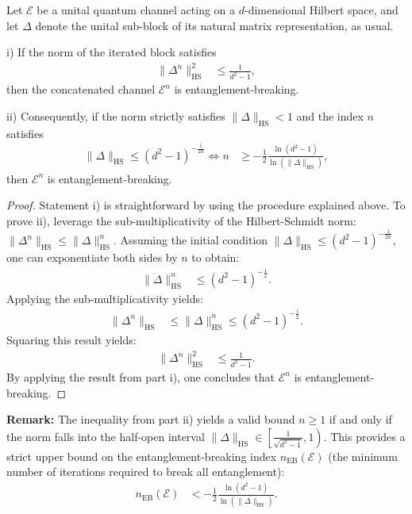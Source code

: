 


\begin{prop}
Let $\mathcal{E}$ be a unital quantum channel acting on a $d$-dimensional Hilbert space, and let $\Delta$ denote the unital sub-block of its natural matrix representation, as usual.

i) If the norm of the iterated block satisfies
\begin{align*}
    \|\Delta^n\|_{\text{HS}}^2 &\le \frac{1}{d^2 - 1},
\end{align*}
then the concatenated channel $\mathcal{E}^n$ is entanglement-breaking.

ii) Consequently, if the norm strictly satisfies $\|\Delta\|_{\text{HS}} < 1$ and the index $n$ satisfies
\begin{align*}
    \|\Delta\|_{\text{HS}} \le (d^2 - 1)^{-\frac{1}{2n}} \iff n &\ge - \frac{1}{2} \frac{\ln(d^2 - 1)}{\ln(\|\Delta\|_{\text{HS}})},
\end{align*}
then $\mathcal{E}^n$ is entanglement-breaking.
\end{prop}

\begin{proof}
Statement i) is straightforward by using the procedure explained above. To prove ii), leverage the sub-multiplicativity of the Hilbert-Schmidt norm: $\|\Delta^n\|_{\text{HS}} \le \|\Delta\|_{\text{HS}}^n$. Assuming the initial condition $\|\Delta\|_{\text{HS}} \le (d^2 - 1)^{-\frac{1}{2n}}$, one can exponentiate both sides by $n$ to obtain:
\begin{align*}
    \|\Delta\|_{\text{HS}}^n &\le (d^2 - 1)^{-\frac{1}{2}}.
\end{align*}
Applying the sub-multiplicativity yields:
\begin{align*}
    \|\Delta^n\|_{\text{HS}} &\le \|\Delta\|_{\text{HS}}^n \le (d^2 - 1)^{-\frac{1}{2}}.
\end{align*}
Squaring this result yields:
\begin{align*}
    \|\Delta^n\|_{\text{HS}}^2 &\le \frac{1}{d^2 - 1}.
\end{align*}
By applying the result from part i), one concludes that $\mathcal{E}^n$ is entanglement-breaking.
\end{proof}

\textbf{Remark:} The inequality from part ii) yields a valid bound $n \ge 1$ if and only if the norm falls into the half-open interval $\|\Delta\|_{\text{HS}} \in \left[ \frac{1}{\sqrt{d^2 - 1}}, 1 \right)$. This provides a strict upper bound on the entanglement-breaking index $n_{\text{EB}}(\mathcal{E})$ (the minimum number of iterations required to break all entanglement):
\begin{align*}
    n_{\text{EB}}(\mathcal{E}) &< - \frac{1}{2} \frac{\ln(d^2 - 1)}{\ln(\|\Delta\|_{\text{HS}})}.
\end{align*}

